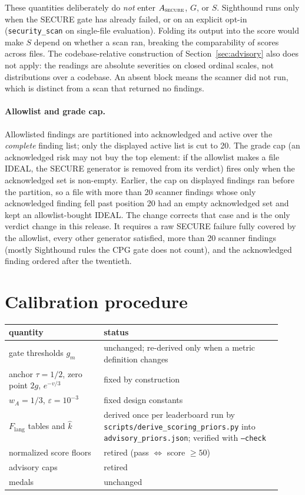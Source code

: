 \documentclass[11pt]{article}
\theoremstyle{remark}
\newcommand{\Flang}{F_{\mathrm{lang}}}
\newcommand{\wA}{w_A}
\begin{document}
These quantities deliberately do \emph{not} enter $A_{\textsc{secure}}$, $G$, or
$S$. Sighthound runs only when the SECURE gate has already failed, or on an
explicit opt-in (\texttt{security\_scan} on single-file evaluation). Folding
its output into the score would make $S$ depend on whether a scan ran, breaking
the comparability of scores across files. The codebase-relative construction of Section~\ref{sec:advisory} also does
not apply: the readings
are absolute severities on closed ordinal scales, not distributions over a
codebase. An absent block means the scanner did not run, which is distinct
from a scan that returned no findings.

\paragraph{Allowlist and grade cap.} Allowlisted findings are partitioned into
acknowledged and active over the \emph{complete} finding list; only the
displayed active list is cut to 20. The grade cap (an acknowledged risk may not
buy the top element: if the allowlist makes a file IDEAL, the SECURE generator
is removed from its verdict) fires only when the acknowledged set is non-empty.
Earlier, the cap on displayed findings ran before the partition, so a file with
more than 20 scanner findings whose only acknowledged finding fell past position
20 had an empty acknowledged set and kept an allowlist-bought IDEAL. The change
corrects that case and is the only verdict change in this release. It requires
a raw SECURE failure fully covered by the allowlist, every other generator
satisfied, more than 20 scanner findings (mostly Sighthound rules the CPG gate
does not count), and the acknowledged finding ordered after the twentieth.

\section{Calibration procedure}

\begin{center}
\begin{tabular}{>{\raggedright\arraybackslash}p{0.32\linewidth}>{\raggedright\arraybackslash}p{0.6\linewidth}}
\toprule
quantity & status \\
\midrule
gate thresholds $g_m$ & unchanged; re-derived only when a metric definition changes \\
anchor $\tau = 1/2$, zero point $2g$, $e^{-v/3}$ & fixed by construction \\
$\wA = 1/3$, $\varepsilon = 10^{-3}$ & fixed design constants \\
$\Flang$ tables and $\hat k$ & derived once per leaderboard run by
  \texttt{scripts/derive\_scoring\_priors.py} into
  \texttt{advisory\_priors.json}; verified with \texttt{--check} \\
normalized score floors & retired (pass $\iff$ score $\ge 50$) \\
advisory caps & retired \\
medals & unchanged \\
\bottomrule
\end{tabular}
\end{center}
\end{document}
